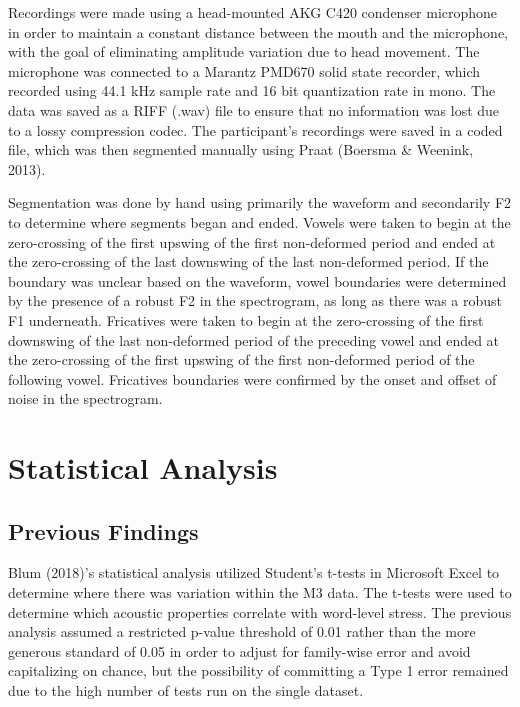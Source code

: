 \documentclass[floatsintext,man]{apa6}
\theoremstyle{definition}
\theoremstyle{definition}
\theoremstyle{definition}
\theoremstyle{remark}
\begin{document}
Recordings were made using a head-mounted AKG C420 condenser microphone
in order to maintain a constant distance between the mouth and the
microphone, with the goal of eliminating amplitude variation due to head
movement. The microphone was connected to a Marantz PMD670 solid state
recorder, which recorded using 44.1 kHz sample rate and 16 bit
quantization rate in mono. The data was saved as a RIFF (.wav) file to
ensure that no information was lost due to a lossy compression codec.
The participant's recordings were saved in a coded file, which was then
segmented manually using Praat (Boersma \& Weenink, 2013).

Segmentation was done by hand using primarily the waveform and
secondarily F2 to determine where segments began and ended. Vowels were
taken to begin at the zero-crossing of the first upswing of the first
non-deformed period and ended at the zero-crossing of the last downswing
of the last non-deformed period. If the boundary was unclear based on
the waveform, vowel boundaries were determined by the presence of a
robust F2 in the spectrogram, as long as there was a robust F1
underneath. Fricatives were taken to begin at the zero-crossing of the
first downswing of the last non-deformed period of the preceding vowel
and ended at the zero-crossing of the first upswing of the first
non-deformed period of the following vowel. Fricatives boundaries were
confirmed by the onset and offset of noise in the spectrogram.

\section{Statistical Analysis}\label{statistical-analysis}

\subsection{Previous Findings}\label{previous-findings}

Blum (2018)'s statistical analysis utilized Student's t-tests in
Microsoft Excel to determine where there was variation within the M3
data. The t-tests were used to determine which acoustic properties
correlate with word-level stress. The previous analysis assumed a
restricted p-value threshold of 0.01 rather than the more generous
standard of 0.05 in order to adjust for family-wise error and avoid
capitalizing on chance, but the possibility of committing a Type 1 error
remained due to the high number of tests run on the single dataset.
\end{document}
